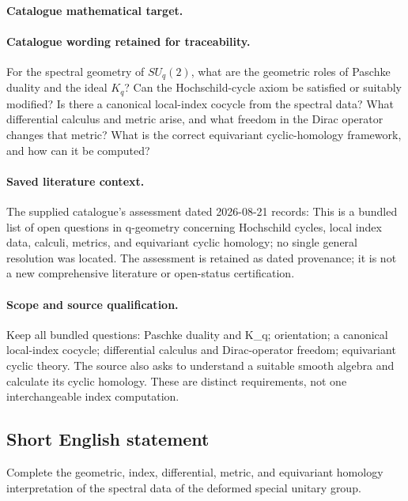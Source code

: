 \documentclass[11pt]{article}
\begin{document}
\paragraph{Catalogue mathematical target.}
\paragraph{Catalogue wording retained for traceability.}
For the spectral geometry of $SU_q(2)$, what are the geometric roles of Paschke duality and the ideal $K_q$? Can the Hochschild-cycle axiom be satisfied or suitably modified? Is there a canonical local-index cocycle from the spectral data? What differential calculus and metric arise, and what freedom in the Dirac operator changes that metric? What is the correct equivariant cyclic-homology framework, and how can it be computed?

\paragraph{Saved literature context.} The supplied catalogue's assessment dated 2026-08-21 records: This is a bundled list of open questions in q-geometry concerning Hochschild cycles, local index data, calculi, metrics, and equivariant cyclic homology; no single general resolution was located. The assessment is retained as dated provenance; it is not a new comprehensive literature or open-status certification.
\paragraph{Scope and source qualification.}Keep all bundled questions: Paschke duality and K_q; orientation; a canonical local-index cocycle; differential calculus and Dirac-operator freedom; equivariant cyclic theory. The source also asks to understand a suitable smooth algebra and calculate its cyclic homology. These are distinct requirements, not one interchangeable index computation.
\subsection{Short English statement}
Complete the geometric, index, differential, metric, and equivariant homology interpretation of the spectral data of the deformed special unitary group.
\end{document}
